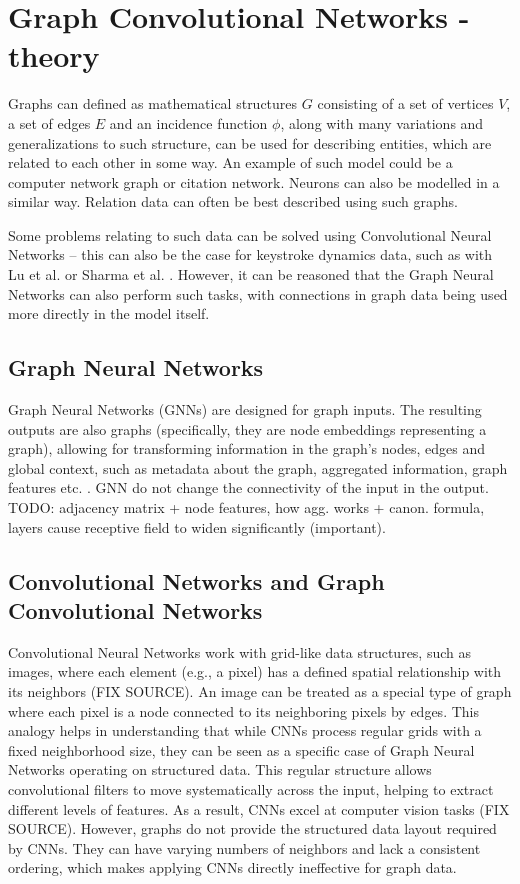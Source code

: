 
\chapter{Graph Convolutional Networks - theory}

Graphs can defined as mathematical structures $G$ consisting of a set of vertices $V$, a set of edges $E$ and an incidence function $\phi$, along with many variations and generalizations to such structure, can be used for describing entities, which are related to each other in some way. An example of such model could be a computer network graph or citation network. Neurons can also be modelled in a similar way. Relation data can often be best described using such graphs. \cite{Lesk2024}

Some problems relating to such data can be solved using Convolutional Neural Networks -- this can also be the case for keystroke dynamics data, such as with Lu et al. \cite{Lu2020} or Sharma et al. \cite{Shar2023}. However, it can be reasoned that the Graph Neural Networks can also perform such tasks, with connections in graph data being used more directly in the model itself.

\section{Graph Neural Networks}
Graph Neural Networks (GNNs) are designed for graph inputs. The resulting outputs are also graphs (specifically, they are node embeddings representing a graph), allowing for transforming information in the graph's nodes, edges and global context, such as metadata about the graph, aggregated information, graph features etc. \cite{sanch2021}. GNN do not change the connectivity of the input in the output. 
TODO: adjacency matrix + node features, how agg. works + canon. formula, layers cause receptive field to widen significantly (important).

\section{Convolutional Networks and Graph Convolutional Networks}
Convolutional Neural Networks work with grid-like data structures, such as images, where each element (e.g., a pixel) has a defined spatial relationship with its neighbors (FIX SOURCE). An image can be treated as a special type of graph where each pixel is a node connected to its neighboring pixels by edges. This analogy helps in understanding that while CNNs process regular grids with a fixed neighborhood size, they can be seen as a specific case of Graph Neural Networks operating on structured data. This regular structure allows convolutional filters to move systematically across the input, helping to extract different levels of features. As a result, CNNs excel at computer vision tasks (FIX SOURCE). However, graphs do not provide the structured data layout required by CNNs. They can have varying numbers of neighbors and lack a consistent ordering, which makes applying CNNs directly ineffective for graph data.

